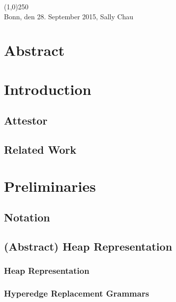 \documentclass[a4paper, 12pt, twoside]{report}
\theoremstyle{plain}
\begin{document}
	\noindent\line(1,0){250}\\
	Bonn, den 28. September 2015, Sally Chau
	
	\clearpage\mbox{}\clearpage
	
	\chapter*{Abstract}
	
	\clearpage\mbox{}\clearpage
	
	\doublespacing
	\tableofcontents
	\singlespacing
	\clearpage\mbox{}\clearpage
	\thispagestyle{empty} 
	
	\pagestyle{fancy}
	\fancyhead[RE]{\nouppercase\leftmark}
	\fancyhead[LO]{\nouppercase\rightmark}
	\fancyhead[LE,RO]{\thepage}
	\cfoot{}
	
	
	\chapter{Introduction}
	
	\section{Attestor}
	
	\section{Related Work}
	
	\chapter{Preliminaries}
	
	\section{Notation}
	
	\section{(Abstract) Heap Representation}
	\subsection{Heap Representation}
	\subsection{Hyperedge Replacement Grammars}
	
\end{document}
